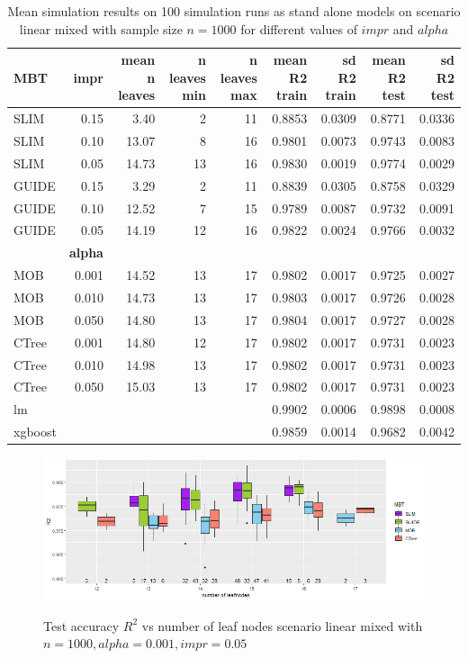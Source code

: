 \begin{table} 
\caption{Mean simulation results on 100 simulation runs as stand alone models on scenario linear mixed with sample size $n = 1000$ for different values of $impr$ and $alpha$}
\centering \tiny
\begin{tabular}[t]{l|r|r|r|r|r|r|r|r}
\hline
MBT & \textbf{impr} & mean n leaves & n leaves min & n leaves max & mean R2 train & sd R2 train & mean R2 test & sd R2 test\\
\hline
SLIM & 0.15 & 3.40 & 2 & 11 & 0.8853 & 0.0309 & 0.8771 & 0.0336\\
SLIM & 0.10 & 13.07 & 8 & 16 & 0.9801 & 0.0073 & 0.9743 & 0.0083\\
SLIM & 0.05 & 14.73 & 13 & 16 & 0.9830 & 0.0019 & 0.9774 & 0.0029\\
GUIDE & 0.15 & 3.29 & 2 & 11 & 0.8839 & 0.0305 & 0.8758 & 0.0329\\
GUIDE & 0.10 & 12.52 & 7 & 15 & 0.9789 & 0.0087 & 0.9732 & 0.0091\\
GUIDE & 0.05 & 14.19 & 12 & 16 & 0.9822 & 0.0024 & 0.9766 & 0.0032\\
\hline
 & \textbf{alpha} &  &  &  &  &  &  & \\
\hline
MOB & 0.001 & 14.52 & 13 & 17 & 0.9802 & 0.0017 & 0.9725 & 0.0027\\
MOB & 0.010 & 14.73 & 13 & 17 & 0.9803 & 0.0017 & 0.9726 & 0.0028\\
MOB & 0.050 & 14.80 & 13 & 17 & 0.9804 & 0.0017 & 0.9727 & 0.0028\\
CTree & 0.001 & 14.80 & 12 & 17 & 0.9802 & 0.0017 & 0.9731 & 0.0023\\
CTree & 0.010 & 14.98 & 13 & 17 & 0.9802 & 0.0017 & 0.9731 & 0.0023\\
CTree & 0.050 & 15.03 & 13 & 17 & 0.9802 & 0.0017 & 0.9731 & 0.0023\\
\hline
lm & & & & & 0.9902 & 0.0006 & 0.9898 & 0.0008\\
xgboost & & & & & 0.9859 & 0.0014 & 0.9682 & 0.0042\\
\hline
\end{tabular}
\label{tab:linear_mixed_summary}
\end{table}

\begin{figure}
\caption{Test accuracy $R^2$ vs number of leaf nodes scenario linear mixed with $n=1000, alpha = 0.001, impr = 0.05$}
    \includegraphics[width=16cm]{Figures/simulations/batchtools/basic_scenarios/linear_mixed/lm_1000_standalone_r2_test.png}
    \label{fig:lm_1000_standalone_r2_test}
\end{figure} 






